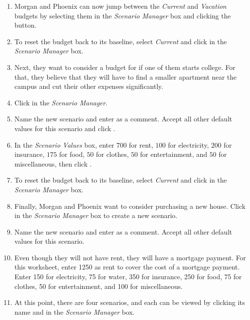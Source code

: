 \begin{enumbox}
\begin{enumerate}
		\item Morgan and Phoenix can now jump between the \textit{Current} and \textit{Vacation} budgets by selecting them in the \textit{Scenario Manager} box and clicking the  button.
		\item To reset the budget back to its baseline, select \textit{Current} and click  in the \textit{Scenario Manager} box.
		\item Next, they want to consider a budget for if one of them starts college. For that, they believe that they will have to find a smaller apartment near the campus and cut their other expenses significantly.
		\item Click  in the \textit{Scenario Manager}.
		\item Name the new scenario  and enter  as a comment. Accept all other default values for this scenario and click .
		\item In the \textit{Scenario Values} box, enter $ 700 $ for rent, $ 100 $ for electricity, $ 200 $ for insurance, $ 175 $ for food, $ 50 $ for clothes, $ 50 $ for entertainment, and $ 50 $ for miscellaneous, then click .
		\item To reset the budget back to its baseline, select \textit{Current} and click  in the \textit{Scenario Manager} box.
		\item Finally, Morgan and Phoenix want to consider purchasing a new house. Click  in the \textit{Scenario Manager} box to create a new scenario.
		\item Name the new scenario  and enter  as a comment. Accept all other default values for this scenario.
		\item Even though they will not have rent, they will have a mortgage payment. For this worksheet, enter 1250 as rent to cover the cost of a mortgage payment. Enter 150 for electricity, 75 for water, 350 for insurance, 250 for food, 75 for clothes, 50 for entertainment, and 100 for miscellaneous.
		\item At this point, there are four scenarios, and each can be viewed by clicking its name and  in the \textit{Scenario Manager} box. 
	

\end{enumerate}
\end{enumbox}
